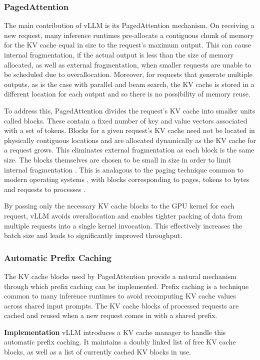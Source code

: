 \documentclass[12pt,twoside]{report}
\begin{document}
\subsubsection{PagedAttention}
The main contribution of vLLM is its PagedAttention mechanism. 
On receiving a new request, many inference runtimes pre-allocate a contiguous chunk of memory for the KV cache equal in size to the request's maximum output.
This can cause internal fragmentation, if the actual output is less than the size of memory allocated, as well as external fragmentation, when smaller requests are unable to be scheduled due to overallocation.
Moreover, for requests that generate multiple outputs, as is the case with parallel and beam search, the KV cache is stored in a different location for each output and so there is no possibility of memory reuse.

To address this, PagedAttention divides the request's KV cache into smaller units called blocks. 
These contain a fixed number of key and value vectors associated with a set of tokens. 
Blocks for a given request's KV cache need not be located in physically contiguous locations and are allocated dynamically as the KV cache for a request grows. 
This eliminates external fragmentation as each block is the same size.
The blocks themselves are chosen to be small in size in order to limit internal fragmentation \cite{kwon2023efficient}.
This is analagous to the paging technique common to modern operating systems \cite{kilburn1962one}, with blocks corresponding to pages, tokens to bytes and requests to processes \cite{kwon2023efficient}.

By passing only the necessary KV cache blocks to the GPU kernel for each request, vLLM avoids overallocation and enables tighter packing of data from multiple requests into a single kernel invocation. 
This effectively increases the batch size and leads to significantly improved throughput.

\subsubsection{Automatic Prefix Caching}
The KV cache blocks used by PagedAttention provide a natural mechanism through which prefix caching can be implemented.
Prefix caching is a technique common to many inference runtimes to avoid recomputing KV cache values across shared input prompts.
The KV cache blocks of processed requests are cached and reused when a new request comes in with a shared prefix.

\textbf{Implementation}
vLLM introduces a KV cache manager to handle this automatic prefix caching.
It maintains a doubly linked list of free KV cache blocks, as well as a list of currently cached KV blocks in use.
\end{document}
